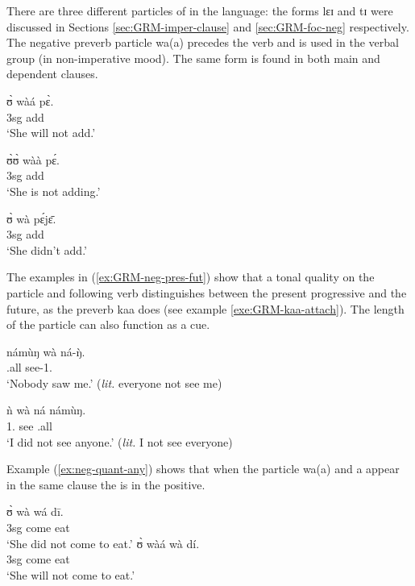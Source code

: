 \begin{exe}
\begin{exe}
\begin{exe}
\begin{exe}
\begin{exe}
\begin{exe}
\begin{exe}
\begin{exe}
\begin{exe}
\begin{exe}
\begin{exe}
\begin{exe}
There are three different particles of  in the language:  the forms {\sls lɛɪ} and {\sls tɪ}   were discussed in Sections \ref{sec:GRM-imper-clause} and  \ref{sec:GRM-foc-neg}  respectively.  The negative preverb particle {\sls wa(a)} precedes the verb and is used in the verbal group (in non-imperative mood). The same form is found in both  main and dependent clauses. 


\ea\label{ex:GRM-neg-pres-fut}

\ea
\gll ʊ̀  wàá pɛ̀.\\
   {\sc 3sg}  {\neg} add\\
\glt  `She will not add.'

 \ex 
\gll  ʊ̀ʊ̀ wàà pɛ́.\\
  {\sc 3sg} {\neg} add\\
\glt  `She is not adding.'


 \ex 
\gll  ʊ̀ wà pɛ́jɛ̄.\\
  {\sc 3sg} {\neg} add\\
\glt  `She didn't  add.'

\z 
 \z

 The examples in (\ref{ex:GRM-neg-pres-fut}) show that a tonal quality on the  particle and following verb  distinguishes between the present progressive and  the future,  as the preverb {\sls kaa} does (see example \ref{exe:GRM-kaa-attach}). The length of the  particle can also function as a cue.

\ea\label{ex:neg-quant-any}
\ea\label{ex:neg-quant-any-1}
\gll námùŋ wà ná-ŋ̀.\\
 {\clf}.all {\neg} see-{1.\sg}\\
\glt  `Nobody saw me.' ({\it lit.} everyone not see me) 

\ex\label{ex:neg-quant-any-2}
\gll  ǹ wà ná námùŋ.\\
  {1.\sg}  {\neg}   see  {\clf}.all\\
\glt  `I did not see anyone.' ({\it lit.} I not see everyone) 

\z 
 \z

 Example (\ref{ex:neg-quant-any}) shows that when the  particle {\sls wa(a)} and a  appear in the same clause the  is  in the positive. 

\ea\label{ex:GRM-neg-come}
 
  
\ea
\gll ʊ̀ wà wá dī.\\
{\sc 3sg} {\neg} come eat\\
\glt `She did not come to eat.'
\ex
\gll ʊ̀ wàá wà dí.\\
{\sc 3sg} {\neg} come eat\\
\glt `She will not come to eat.'


\end{exe}
\end{exe}
\end{exe}
\end{exe}
\end{exe}
\end{exe}
\end{exe}
\end{exe}
\end{exe}
\end{exe}
\end{exe}
\end{exe}
